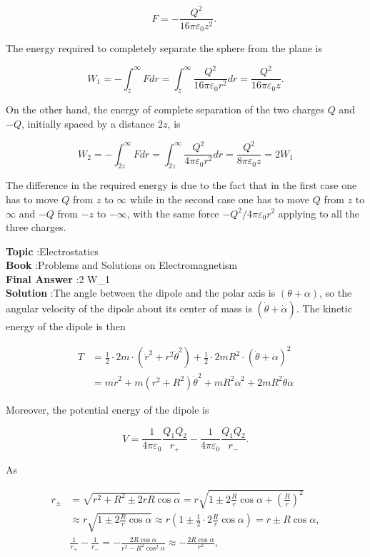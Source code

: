 \documentclass[10pt]{article}
\begin{document}
$$
F=-\frac{Q^{2}}{16 \pi \varepsilon_{0} z^{2}} \text {. }
$$

The energy required to completely separate the sphere from the plane is

$$
W_{1}=-\int_{z}^{\infty} F d r=\int_{z}^{\infty} \frac{Q^{2}}{16 \pi \varepsilon_{0} r^{2}} d r=\frac{Q^{2}}{16 \pi \varepsilon_{0} z} .
$$

On the other hand, the energy of complete separation of the two charges $Q$ and $-Q$, initially spaced by a distance $2 z$, is

$$
W_{2}=-\int_{2 z}^{\infty} F d r=\int_{2 z}^{\infty} \frac{Q^{2}}{4 \pi \varepsilon_{0} r^{2}} d r=\frac{Q^{2}}{8 \pi \varepsilon_{0} z}=2 W_{1}
$$

The difference in the required energy is due to the fact that in the first case one has to move $Q$ from $z$ to $\infty$ while in the second case one has to move $Q$ from $z$ to $\infty$ and $-Q$ from $-z$ to $-\infty$, with the same force $-Q^{2} / 4 \pi \varepsilon_{0} r^{2}$ applying to all the three charges.

\textbf{Topic} :Electrostatics\\
\textbf{Book} :Problems and Solutions on Electromagnetism\\
\textbf{Final Answer} :2 W_{1}\\


\textbf{Solution} :The angle between the dipole and the polar axis is $(\theta+\alpha)$, so the angular velocity of the dipole about its center of mass is $(\dot{\theta}+\dot{\alpha})$. The kinetic energy of the dipole is then

$$
\begin{aligned}
T &=\frac{1}{2} \cdot 2 m \cdot\left(\dot{r}^{2}+r^{2} \dot{\theta}^{2}\right)+\frac{1}{2} \cdot 2 m R^{2} \cdot(\dot{\theta}+\dot{\alpha})^{2} \\
&=m \dot{r}^{2}+m\left(r^{2}+R^{2}\right) \dot{\theta}^{2}+m R^{2} \dot{\alpha}^{2}+2 m R^{2} \dot{\theta} \dot{\alpha}
\end{aligned}
$$

Moreover, the potential energy of the dipole is

$$
V=\frac{1}{4 \pi \varepsilon_{0}} \frac{Q_{1} Q_{2}}{r_{+}}-\frac{1}{4 \pi \varepsilon_{0}} \frac{Q_{1} Q_{2}}{r_{-}} .
$$

As

$$
\begin{aligned}
r_{\pm} &=\sqrt{r^{2}+R^{2} \pm 2 r R \cos \alpha}=r \sqrt{1 \pm 2 \frac{R}{r} \cos \alpha+\left(\frac{R}{r}\right)^{2}} \\
& \approx r \sqrt{1 \pm 2 \frac{R}{r} \cos \alpha} \approx r\left(1 \pm \frac{1}{2} \cdot 2 \frac{R}{r} \cos \alpha\right)=r \pm R \cos \alpha, \\
& \frac{1}{r_{+}}-\frac{1}{r_{-}}=-\frac{2 R \cos \alpha}{r^{2}-R^{2} \cos ^{2} \alpha} \approx-\frac{2 R \cos \alpha}{r^{2}},
\end{aligned}
$$
\end{document}
